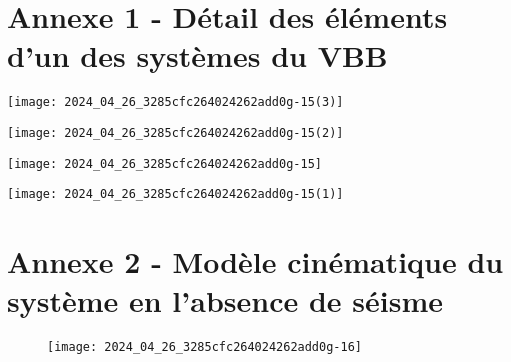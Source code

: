 \newpage
\clearpage
\cleardoublepage

\section*{Annexe 1 - Détail des éléments d'un des systèmes du VBB}
\begin{multicols}{2}
\begin{center}
\texttt{[image: 2024\_04\_26\_3285cfc264024262add0g-15(3)]}
\end{center}
\begin{center}
\texttt{[image: 2024\_04\_26\_3285cfc264024262add0g-15(2)]}
\end{center}
\end{multicols}

\begin{multicols}{2}
\begin{center}
\texttt{[image: 2024\_04\_26\_3285cfc264024262add0g-15]}
\end{center}
\begin{center}
\texttt{[image: 2024\_04\_26\_3285cfc264024262add0g-15(1)]}
\end{center}
\end{multicols}
%



\section*{Annexe 2 - Modèle cinématique du système en l'absence de séisme}
\begin{figure}[!h]
\centering
\texttt{[image: 2024\_04\_26\_3285cfc264024262add0g-16]}
\end{figure}

